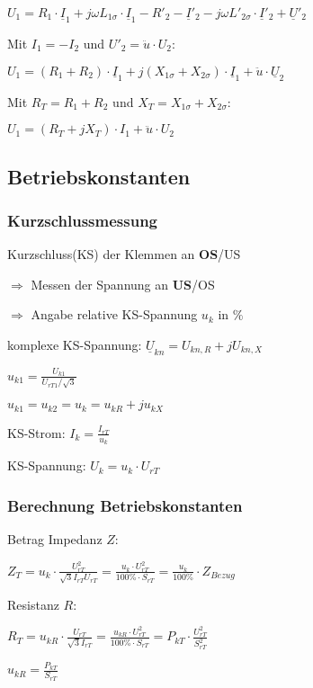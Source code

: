 \documentclass[a4paper,11pt]{article}
\begin{document}
	$U_{1} = R_{1} \cdot \underline{I}_{1} + j\omega L_{1\sigma} \cdot \underline{I}_{1} - R'_{2}- \underline{I}'_{2}-j\omega L'_{2\sigma} \cdot \underline{I}'_{2}+ \underline{U}'_{2}$

	Mit $I_{1} = -I_{2}$ und $U'_{2} = \ddot{u} \cdot U_2$:

	$U_{1} = (R_1 + R_2) \cdot \underline{I}_1 + j(X_{1\sigma} + X_{2\sigma}) \cdot \underline{I}_1 + \ddot{u} \cdot \underline{U}_2$

	Mit $R_T = R_1 + R_2$ und $X_T = X_{1\sigma} + X_{2\sigma}$:

	$U_1 = (R_T + jX_T) \cdot I_1 + \ddot{u} \cdot U_2$

	\subsection{Betriebskonstanten}
	\subsubsection{Kurzschlussmessung}

	Kurzschluss(KS) der Klemmen an  \textbf{OS}/US

	$\Rightarrow$ Messen der Spannung an \textbf{US}/OS

	$\Rightarrow$ Angabe relative KS-Spannung $u_{k}$ in $\%$

	komplexe KS-Spannung: $\underline{U}_{kn} = U_{kn,R} +jU_{kn,X}$

	$u_{k1} = \frac{U_{k1}}{U_{rT1}/ \sqrt{3}}$

	$u_{k1} = u_{k2} = u_{k} = u_{kR}+j u_{kX}$

	KS-Strom:
	$I_k = \frac{I_{rT}}{u_k}$

	KS-Spannung:
	$U_k = u_k \cdot U_{rT}$
	\subsubsection{Berechnung Betriebskonstanten}

	Betrag Impedanz $Z$:

	$Z_T = u_k \cdot \frac{U_{rT}^2}{\sqrt{3}I_{rT}U_{rT}} =\frac{u_k \cdot U_{rT}^2}{100 \% \cdot S_{rT}} = \frac{u_k}{100\%} \cdot Z_{Bezug}$

	Resistanz $R$:

	$R_T = u_{kR} \cdot \frac{U_{rT}}{\sqrt{3} I_{rT}} = \frac{u_{kR}\cdot U^2_{rT}}{100\% \cdot S_{rT}} = P_{kT} \cdot \frac{U_{rT}^2}{S_{rT}^2}$

	$u_{kR} = \frac{P_{kT}}{S_{rT}}$
\end{document}
